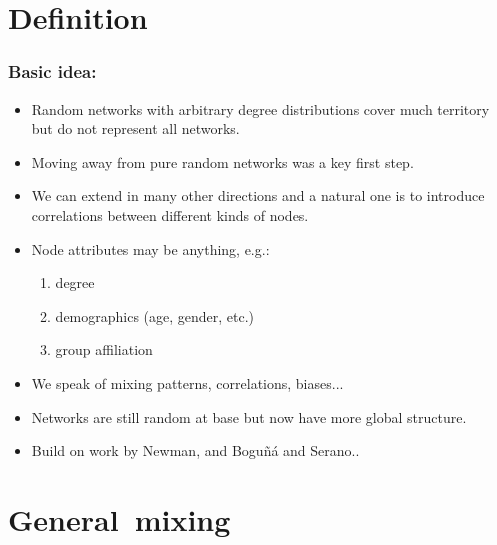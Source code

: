 





\section{Definition}

\begin{frame}
  \frametitle{Basic idea:}

  \begin{itemize}
  \item<1->
    Random networks with arbitrary degree distributions
    cover much territory but do not represent
    all networks.
  \item<2->
    Moving away from pure random networks was a key first step.
  \item<3->
    We can extend in many other directions and a natural
    one is to introduce correlations between 
    different kinds of nodes.
  \item<4->
    Node attributes may be anything, e.g.:
    \begin{enumerate}
    \item degree
    \item demographics (age, gender, etc.)
    \item group affiliation
    \end{enumerate}
  \item<5->
    We speak of mixing patterns, correlations, biases...
  \item<6->
    Networks are still random at base but now have more 
    global structure.
  \item<7->
    Build on work by Newman\cite{newman2002a,newman2003e},
    and Bogu\~{n}\'{a} and Serano.\cite{boguna2005a}.
  \end{itemize}
  
\end{frame}

\section{General\ mixing}

